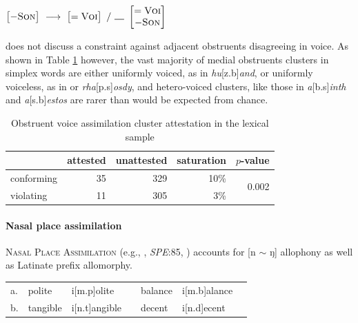 \begin{example}
\label{ovarule}
$\begin{bmatrix} -\textsc{Son} \end{bmatrix}~\goesto~\begin{bmatrix} =\textsc{Voi} \end{bmatrix}~/~\gap~\begin{bmatrix} =\textsc{Voi} \\ -\textsc{Son} \end{bmatrix}$
\end{example}

\noindent
\citet{Pierrehumbert1994} does not discuss a constraint against adjacent obstruents disagreeing in voice. As shown in Table \ref{ovatab} however, the vast majority of medial obstruents clusters in simplex words are either uniformly voiced, as in \emph{hu}[z.b]\emph{and}, or uniformly voiceless, as in or \emph{rha}[p.s]\emph{osdy}, and hetero-voiced clusters, like those in \emph{a}[b.s]\emph{inth} and \emph{a}[s.b]\emph{estos} are rarer than would be expected from chance.

\begin{table}
\centering
\begin{tabular}{l rrrr}
\toprule
           & attested & unattested & saturation & $p$-value \\
\midrule
conforming & 35       & 329        & 10\%       & \multirow{2}{*}{0.002} \\
violating  & 11       & 305        &  3\%       \\
\bottomrule
\end{tabular}
\caption{Obstruent voice assimilation cluster attestation in the lexical sample}
\label{ovatab}
\end{table}

\paragraph{Nasal place assimilation}
\label{npa}

\textsc{Nasal Place Assimilation} (e.g., \citealt[149]{Borowsky1986}, \emph{SPE}:85, \citealt[62]{Halle1985a}) accounts for [n $\sim$ ŋ] allophony as well as Latinate prefix allomorphy.

\begin{example}
\label{nparule}
\begin{tabular}{l l l l l l l}
a. & {polite}   & {i}[m.p]{olite}   & & {balance} & {i}[m.b]{alance} \\
b. & {tangible} & {i}[n.t]{angible} & & {decent}  & {i}[n.d]{ecent}  \\
\end{tabular}
\end{example}

